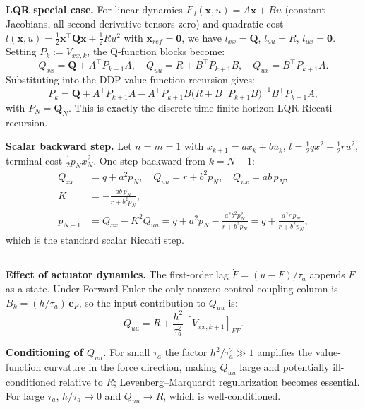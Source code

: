 \subsection{}
\textbf{LQR special case.} For linear dynamics $F_d(\mathbf{x},u) = A\mathbf{x} + Bu$ (constant Jacobians, all second-derivative tensors zero) and quadratic cost $l(\mathbf{x},u) = \frac{1}{2}\mathbf{x}^\top \mathbf{Q}\mathbf{x} + \frac{1}{2}Ru^2$ with $\mathbf{x}_{ref} = \mathbf{0}$, we have $l_{xx} = \mathbf{Q}$, $l_{uu} = R$, $l_{ux} = \mathbf{0}$. Setting $P_k := V_{xx,k}$, the Q-function blocks become:
\begin{equation}
    Q_{xx} = \mathbf{Q} + A^\top P_{k+1}A, \quad Q_{uu} = R + B^\top P_{k+1}B, \quad Q_{ux} = B^\top P_{k+1}A.
\end{equation}
Substituting into the DDP value-function recursion gives:
\begin{equation}
    P_k = \mathbf{Q} + A^\top P_{k+1}A - A^\top P_{k+1}B\bigl(R + B^\top P_{k+1}B\bigr)^{-1}B^\top P_{k+1}A,
\end{equation}
with $P_N = \mathbf{Q}_N$. This is exactly the discrete-time finite-horizon LQR Riccati recursion.

\textbf{Scalar backward step.} Let $n = m = 1$ with $x_{k+1} = ax_k + bu_k$, $l = \frac{1}{2}qx^2 + \frac{1}{2}ru^2$, terminal cost $\frac{1}{2}p_N x_N^2$. One step backward from $k = N-1$:
\begin{align*}
    Q_{xx} &= q + a^2 p_N, \quad Q_{uu} = r + b^2 p_N, \quad Q_{ux} = ab\,p_N, \\
    K &= -\frac{ab\,p_N}{r + b^2 p_N}, \\
    p_{N-1} &= Q_{xx} - K^2 Q_{uu} = q + a^2 p_N - \frac{a^2 b^2 p_N^2}{r + b^2 p_N} = q + \frac{a^2 r\, p_N}{r + b^2 p_N},
\end{align*}
which is the standard scalar Riccati step.

\subsection{}
\textbf{Effect of actuator dynamics.} The first-order lag $\dot F = (u - F)/\tau_a$ appends $F$ as a state. Under Forward Euler the only nonzero control-coupling column is $B_k = (h/\tau_a)\,\mathbf{e}_F$, so the input contribution to $Q_{uu}$ is:
\begin{equation}
    Q_{uu} = R + \frac{h^2}{\tau_a^2}\,[V_{xx,k+1}]_{FF}.
\end{equation}

\textbf{Conditioning of $Q_{uu}$.} For small $\tau_a$ the factor $h^2/\tau_a^2 \gg 1$ amplifies the value-function curvature in the force direction, making $Q_{uu}$ large and potentially ill-conditioned relative to $R$; Levenberg--Marquardt regularization becomes essential. For large $\tau_a$, $h/\tau_a \to 0$ and $Q_{uu} \to R$, which is well-conditioned.

